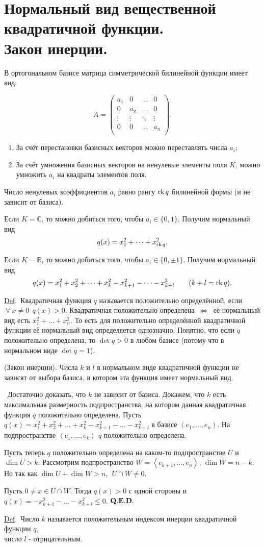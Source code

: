 \documentclass[a4paper]{article}%
\renewcommand{\rk}{{\rm rk\,}}%
\renewcommand{\de}{\par\noindent\underline{Def}.\ }%
\renewcommand{\ab}{\par\noindent}%
\newcommand{\dok}{\par\noindent{\textsl{Доказательство}.}\ }%
\newcommand{\qed}{\quad${{\bf Q.E.D.}}$}
\newcommand{\baz}[1]{\left(#1_1,\dots,#1_n\right)}%
\newcommand{\lr}{\Leftrightarrow}%
\newcommand{\lob}[1]{\left\langle#1\right\rangle}%
\renewcommand{\le}{\leqslant}
\begin{document}
\section{Нормальный вид вещественной квадратичной функции.\\ Закон инерции.}
\label{q12} %
В ортогональном базисе матрица симметрической билинейной функции имеет вид:\ab%
$$A=\left(%
\begin{array}{cccc}
  a_1 & 0 & \dots & 0 \\
  0 & a_2 & \dots & 0 \\
  \vdots & \vdots & \ddots & \vdots \\
  0 & 0 & \dots & a_n \\
\end{array}%
\right).$$
\begin{enumerate}
    \item За счёт перестановки базисных векторов можно переставлять числа $a_i$;
    \item За счёт умножения базисных векторов на ненулевые элементы поля $K$, можно умножить $a_i$ на квадраты
    элементов поля.
\end{enumerate}
\ab Число ненулевых коэффициентов $a_i$ равно рангу $\rk q$ билинейной формы (и не зависит от базиса). %
\ab Если $K=\mathbb{C}$, то можно добиться того, чтобы $a_i\in\{0,1\}$. Получим нормальный вид
$$q(x)=x_1^2+\dots+x_{\rk q}^2.$$
\ab Если $K=\mathbb{R}$, то можно добиться того, чтобы $a_i\in\{0, \pm 1\}.$ Получим нормальный вид
$$
q(x)=x_1^2+x_2^2+\dots+x_k^2-x_{k+1}^2-\dots-x_{k+l}^2\qquad(k+l=\rk q).
$$
\de Квадратичная функция $q$ называется положительно определённой, если $\ \forall\ x\ne 0\ \ q(x)>0.$
Квадратичная положительно определена $\ \lr\ $ её нормальный вид есть $x_1^2+\dots+x_n^2.$ То есть для
положительно определённой квадратичной функции её нормальный вид определяется однозначно. Понятно, что если
$q$ положительно определена, то $\det q>0$ в любом базисе (потому что в нормальном виде $\det q=1$). %
\ab{\bf Теорема} (Закон инерции). Числа $k$ и $l$ в нормальном виде квадратичной функции не зависят от выбора
базиса, в котором эта функция имеет нормальный вид. %
\dok Достаточно доказать, что $k$ не зависит от базиса. Докажем, что $k$ есть максимальная размерность
подпространства, на котором данная квадратичная функция $q$ положительно определена. %
Пусть $q(x)=x_1^2+x_2^2+\dots+x_k^2-x_{k+1}^2-\dots-x_{k+l}^2$ в базисе $\baz{e}$. На подпространстве
$\lob{e_1,\dots,e_k}$ $q$ положительно определена. %
\ab Пусть теперь $q$ положительно определена на каком-то подпространстве $U$ и $\dim U>k$. Рассмотрим
подпространство $W=\lob{e_{k+1},\dots,e_n}$, $\dim W=n-k$. Но так как $\dim U+\dim W>n,\ \ U\cap W\ne 0.$ %
\ab Пусть $0\ne x\in U\cap W.$ Тогда $q(x)>0$ с одной стороны и $q(x)=-x_{k+1}^2-\dots-x_{k+l}^2\le 0$. \qed %
\de Число $k$ называется положительным индексом инерции квадратичной функции $q$, \\число $l$ - отрицательным. %
\end{document}
